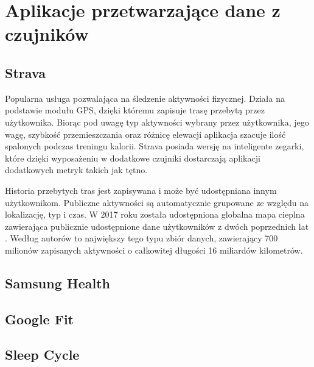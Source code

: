 \section{Aplikacje przetwarzające dane z czujników}

\subsection{Strava}
Popularna usługa pozwalająca na śledzenie aktywności fizycznej. Działa na podstawie modułu GPS, dzięki któremu zapisuje trasę przebytą przez użytkownika. Biorąc pod uwagę typ aktywności wybrany przez użytkownika, jego wagę, szybkość przemieszczania oraz różnicę elewacji aplikacja szacuje ilość spalonych podczas treningu kalorii. Strava posiada wersję na inteligente zegarki, które dzięki wyposażeniu w dodatkowe czujniki dostarczają aplikacji dodatkowych metryk takich jak tętno. 

Historia przebytych tras jest zapisywana i może być udostępniana innym użytkownikom. Publiczne aktywności są automatycznie grupowane ze względu na lokalizację, typ i czas. W 2017 roku została udostępniona globalna mapa cieplna zawierająca publicznie udostępnione dane użytkowników z dwóch poprzednich lat \cite{Strava_Heatmap}. Według autorów to największy tego typu zbiór danych, zawierający 700 milionów zapisanych aktywności o całkowitej długości 16 miliardów kilometrów.


\subsection{Samsung Health}

\subsection{Google Fit}

\subsection{Sleep Cycle}
